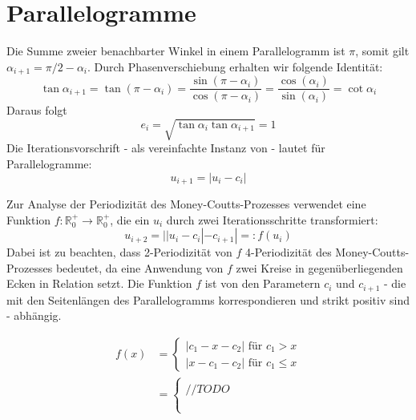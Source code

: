 \chapter{Parallelogramme}

Die Summe zweier benachbarter Winkel in einem Parallelogramm ist $\pi$,
somit gilt $\alpha_{i+1} = \pi/2 - \alpha_i$.
Durch Phasenverschiebung erhalten wir folgende Identität:
\begin{equation*}
    \tan\alpha_{i+1}  = \tan(\pi - \alpha_i)
    = \frac{\sin(\pi - \alpha_i)}{\cos(\pi - \alpha_i)}
    = \frac{\cos(\alpha_i)}{\sin(\alpha_i)}
    = \cot\alpha_i
\end{equation*}
Daraus folgt
\begin{equation*}
    e_i = \sqrt{\tan\alpha_i \tan \alpha_{i+1}} = 1
\end{equation*}
Die Iterationsvorschrift - als vereinfachte Instanz von  - lautet für Parallelogramme:
\begin{equation*}
    u_{i+1}=|u_i - c_i|
\end{equation*}

Zur Analyse der Periodizität des Money-Coutts-Prozesses verwendet \citet{Troub2000}
eine Funktion $f:\mathbb{R}_0^+ \to \mathbb{R}_0^+$, die ein $u_i$ durch zwei Iterationsschritte transformiert:
\begin{equation*}
    u_{i+2}=||u_i-c_i|-c_{i+1}| =: f(u_i)
\end{equation*}
Dabei ist zu beachten, dass 2-Periodizität von $f$ 4-Periodizität des Money-Coutts-Prozesses bedeutet,
da eine Anwendung von $f$ zwei Kreise in gegenüberliegenden Ecken in Relation setzt.
Die Funktion $f$ ist von den Parametern $c_i$ und $c_{i+1}$ - die mit den Seitenlängen des Parallelogramms korrespondieren und strikt positiv sind - abhängig.

\begin{align*}
    f(x) & = \begin{cases}
                 |c_1-x-c_2| \text{ für } c_1 > x \\
                 |x-c_1-c_2| \text{ für } c_1 \leq x
             \end{cases} \\
         & =\begin{cases}
                \\ // TODO
                \\
                \\
                \\
            \end{cases}
\end{align*}

